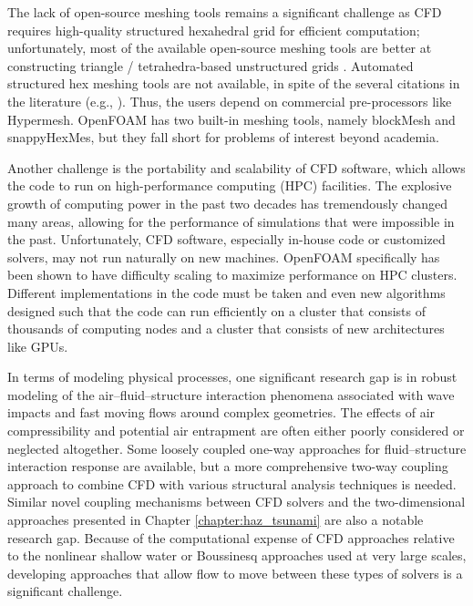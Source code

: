 The lack of open-source meshing tools remains a significant challenge as CFD requires high-quality structured hexahedral grid for efficient computation;  unfortunately, most of the available open-source meshing tools are better at constructing triangle / tetrahedra-based unstructured grids \citep{geuzaine2009gmsh}. Automated structured hex meshing tools are not available, in spite of the several citations in the literature (e.g., \cite{yamakawa2003fully, verhetsel2019finding, gao2017robust}). Thus, the users  depend on commercial pre-processors like Hypermesh. OpenFOAM has two built-in meshing tools, namely blockMesh and snappyHexMes, but they fall short for problems of interest beyond academia. 

Another challenge is the portability and scalability of CFD software, which allows the code to run on high-performance computing (HPC) facilities. The explosive growth of computing power in the past two decades has tremendously changed many areas, allowing for the performance of simulations that were impossible in the past. Unfortunately, CFD software, especially in-house code or customized solvers, may not run naturally on new machines.  OpenFOAM specifically has been shown to have difficulty scaling to maximize performance on HPC clusters. Different implementations in the code must be taken and even new algorithms designed such that the code can run efficiently on a cluster that consists of thousands of computing nodes and a cluster that consists of new architectures like GPUs.

In terms of modeling physical processes, one significant research gap is in robust modeling of the air--fluid--structure interaction phenomena associated with wave impacts and fast moving flows around complex geometries.  The effects of air compressibility and potential air entrapment are often either poorly considered or neglected altogether.  Some loosely coupled one-way approaches for fluid--structure interaction response are available, but a more comprehensive two-way coupling approach to combine CFD with various structural analysis techniques is needed.  Similar novel coupling mechanisms between CFD solvers and the two-dimensional approaches presented in Chapter \ref{chapter:haz_tsunami} are also a notable research gap.  Because of the computational expense of CFD approaches relative to the nonlinear shallow water or Boussinesq approaches used at very large scales, developing approaches that allow flow to move between these types of solvers is a significant challenge.
